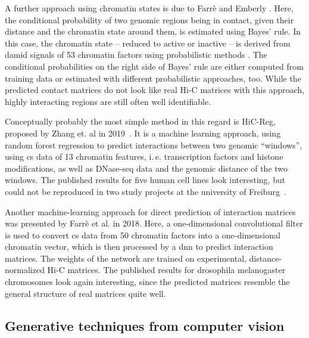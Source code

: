 A further approach using chromatin states is due to Farr\`e and Emberly \cite{Farre2018}.
Here, the conditional probability of two genomic regions being in contact, given their distance and the chromatin state around them,
is estimated using Bayes' rule. 
In this case, the chromatin state -- reduced to active or inactive -- is derived from \acrfull{damid} signals of 53 chromatin factors using probabilistic methods \cite{Zhou2016}.
The conditional probabilities on the right side of Bayes' rule are either computed from training data or estimated with different probabilistic approaches, too.
While the predicted contact matrices do not look like real Hi-C matrices with this approach, highly interacting regions are still often well identifiable.




Conceptually probably the most simple method in this regard is HiC-Reg, 
proposed by Zhang et. al in 2019~\cite{Zhang2019}. 
It is a machine learning approach, using random forest regression to predict interactions
between two genomic ``windows'', using \acrshort{cs} data of 13 chromatin features, i.\,e. transcription factors and histone modifications, as well
as DNase-seq data and the genomic distance of the two windows. 
The published results for five human cell lines look interesting, but could not be reproduced in two study projects at the university of Freiburg~\cite{Krauth2020,Bajorat2019}.

Another machine-learning approach for direct prediction of interaction matrices was presented by Farr\`e et al. \cite{Farre2018a}
in 2018. Here, a one-dimensional convolutional filter is used to convert \acrshort{cs} data from 50 chromatin factors into a 
one-dimensional chromatin vector, which is then processed by a \acrfull{dnn} to predict interaction matrices. 
The weights of the network are trained on experimental, distance-normalized Hi-C matrices.
The published results for drosophila melanogaster chromosomes look again interesting, since the predicted matrices resemble the general structure of real matrices quite well.



\subsection{Generative techniques from computer vision} \label{sec:prior:generativeCV}
